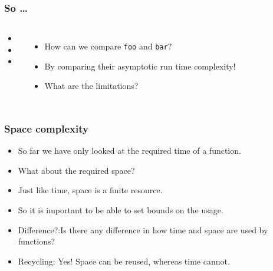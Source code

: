 \begin{frame}
	\frametitle{So \ldots}

	\begin{columns}
	\begin{itemize}
		\item 
		\item 
		\item 
	\end{itemize}	
		
	\begin{itemize}
		\item How can we compare \texttt{foo} and \texttt{bar}?
		\item By comparing their asymptotic run time complexity!
		\item What are the limitations?
	\end{itemize}	
		
	\end{columns}
\end{frame}

\begin{frame}
	\frametitle{Space complexity}
	\begin{itemize}
		\item So far we have only looked at the required \alert{time} of a function.
		\item What about the required \alert{space}?
			
		\item Just like time, space is a \alert{finite} resource.	
		\item So it is important to be able to set bounds on the usage.
	
		\item Difference?:Is there any difference in how time and space are used by functions?
		\item Recycling:	Yes! Space can be reused, whereas time cannot.
	\end{itemize}
\end{frame}

